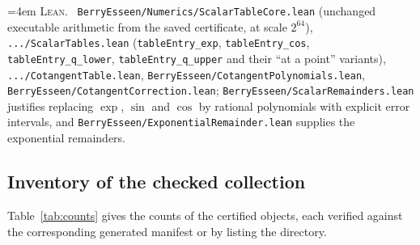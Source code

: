 \documentclass[10pt,a4paper]{article}
\theoremstyle{plain}
\theoremstyle{definition}
\newcommand{\lean}[1]{\texttt{#1}}
\newcommand{\file}[1]{\texttt{#1}}
\newenvironment{leanref}%
  {\par\addvspace{3pt}\begingroup\sloppy\emergencystretch=4em
   \noindent\footnotesize\textsc{Lean.}\ \ignorespaces}%
  {\par\endgroup\addvspace{3pt}}
\begin{document}
\begin{leanref}
\file{BerryEsseen/Numerics/ScalarTableCore.lean} (unchanged executable
arithmetic from the saved certificate, at scale $2^{64}$),
\file{.../ScalarTables.lean} (\lean{tableEntry\_exp},
\lean{tableEntry\_cos}, \lean{tableEntry\_q\_lower},
\lean{tableEntry\_q\_upper} and their ``at a point'' variants),
\file{.../CotangentTable.lean},
\file{BerryEsseen/CotangentPolynomials.lean},
\file{BerryEsseen/CotangentCorrection.lean};
\file{BerryEsseen/ScalarRemainders.lean} justifies replacing $\exp$, $\sin$ and
$\cos$ by rational polynomials with explicit error intervals, and
\file{BerryEsseen/ExponentialRemainder.lean} supplies the exponential
remainders.
\end{leanref}

\subsection{Inventory of the checked collection}

Table~\ref{tab:counts} gives the counts of the certified objects, each verified
against the corresponding generated manifest or by listing the directory.
\end{document}
